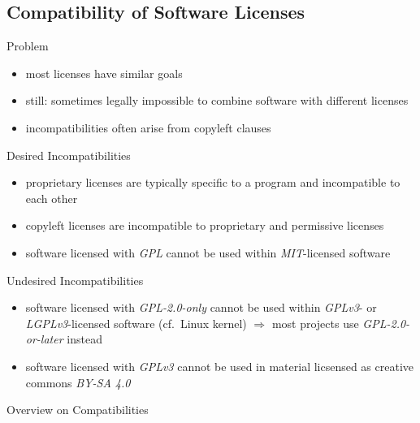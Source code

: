 \subsection{Compatibility of Software Licenses}
\begin{frame}{\insertsubsection}%
\begin{fancycolumns}
\begin{note}{Problem}
	\begin{itemize}
		\item most licenses have similar goals
		\item still: sometimes legally impossible to combine software with different licenses
		\item incompatibilities often arise from copyleft clauses
	\end{itemize}
\end{note}
\begin{example}{Desired Incompatibilities}
	\begin{itemize}
		\item proprietary licenses are typically specific to a program and incompatible to each other
		\item copyleft licenses are incompatible to proprietary and permissive licenses
		\item software licensed with \emph{GPL} cannot be used within \emph{MIT}-licensed software
	\end{itemize}
\end{example}
\nextcolumn
\begin{example}{Undesired Incompatibilities}
	\begin{itemize}
		\item software licensed with \emph{GPL-2.0-only} cannot be used within \emph{GPLv3}- or \emph{LGPLv3}-licensed software (cf.\ Linux kernel) $\Rightarrow$ most projects use \emph{GPL-2.0-or-later} instead
		\item software licensed with \emph{GPLv3} cannot be used in material licsensed as creative commons \emph{BY-SA 4.0} 
	\end{itemize}
\end{example}
\begin{exampletight}{Overview on Compatibilities}
	\centering{} %
\end{exampletight}
\end{fancycolumns}
\end{frame}


